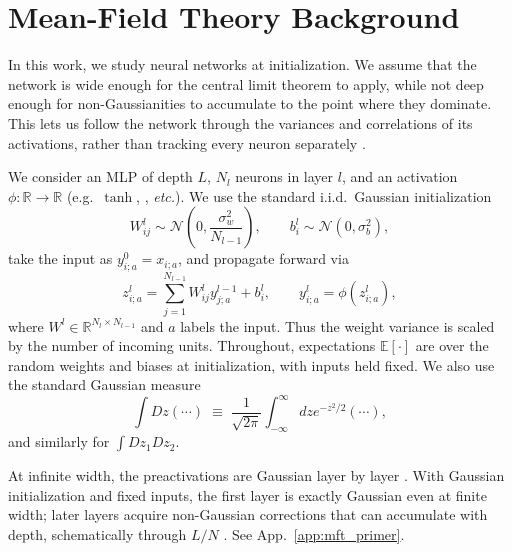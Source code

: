 \section{Mean-Field Theory Background}
\label{sec:mft_background}
In this work, we study neural networks at initialization. We assume that the network is wide enough for the central limit theorem to apply, while not deep enough for non-Gaussianities to accumulate to the point where they dominate. This lets us follow the network through the variances and correlations of its activations, rather than tracking every neuron separately \cite{poole2016exponentialexpressivitydeepneural,schoenholz2017deepinformationpropagation,Bahri2020StatMechDeepLearning,bahri2024leshoucheslecturesdeep}.

We consider an MLP of depth $L$, $N_l$ neurons in layer $l$, and an activation $\phi:\mathbb{R}\to\mathbb{R}$ (e.g.\ $\tanh$, \relu{}, \emph{etc.}). We use the standard i.i.d.\ Gaussian initialization
\begin{equation}
W^{l}_{ij}\sim \mathcal{N}\left(0,\frac{\sigma_{w}^{2}}{N_{l-1}}\right), \qquad b^{l}_{i}\sim \mathcal{N}\left(0,\sigma_{b}^{2}\right),
\end{equation}
take the input as $y^{0}_{i;a}=x_{i;a}$, and propagate forward via
\begin{equation}
z^{l}_{i;a}= \sum_{j=1}^{N_{l-1}} W^{l}_{ij} y^{l-1}_{j;a}+b^{l}_{i}, \qquad y^{l}_{i;a}=\phi\left(z^{l}_{i;a}\right),
\end{equation}
where $W^l\in\mathbb R^{N_l\times N_{l-1}}$ and $a$ labels the input. Thus the weight variance is scaled by the number of incoming units. Throughout, expectations $\mathbb{E}[\cdot]$ are over the random weights and biases at initialization, with inputs held fixed. We also use the standard Gaussian measure
\begin{equation}
\int Dz (\cdots)\;\equiv\;\frac{1}{\sqrt{2\pi}}\int_{-\infty}^{\infty}dz e^{-z^{2}/2}(\cdots),
\end{equation}
and similarly for $\int Dz_1 Dz_2$.

At infinite width, the preactivations are Gaussian layer by layer \cite{Lee2018DNNasGP}. With Gaussian initialization and fixed inputs, the first layer is exactly Gaussian even at finite width; later layers acquire non-Gaussian corrections that can accumulate with depth, schematically through $L/N$ \cite{roberts2022principlesdeeplearningtheory,bahri2024leshoucheslecturesdeep}. See App.~\ref{app:mft_primer}.

